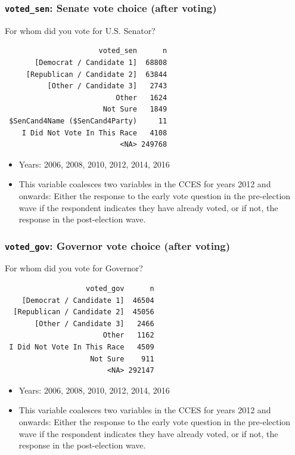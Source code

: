 \documentclass[10pt,article,oneside]{memoir}
\theoremstyle{definition}
\begin{document}
\subsubsection{\texorpdfstring{\texttt{voted\_sen}: Senate vote choice
(after
voting)}{voted\_sen: Senate vote choice (after voting)}}\label{voted_sen-senate-vote-choice-after-voting}

For whom did you vote for U.S. Senator?

\begin{verbatim}
                      voted_sen      n
       [Democrat / Candidate 1]  68808
     [Republican / Candidate 2]  63844
          [Other / Candidate 3]   2743
                          Other   1624
                       Not Sure   1849
 $SenCand4Name ($SenCand4Party)     11
    I Did Not Vote In This Race   4108
                           <NA> 249768
\end{verbatim}

\begin{itemize}
\tightlist
\item
  Years: 2006, 2008, 2010, 2012, 2014, 2016
\item
  This variable coalesces two variables in the CCES for years 2012 and
  onwards: Either the response to the early vote question in the
  pre-election wave if the respondent indicates they have already voted,
  or if not, the response in the post-election wave.
\end{itemize}

\subsubsection{\texorpdfstring{\texttt{voted\_gov}: Governor vote choice
(after
voting)}{voted\_gov: Governor vote choice (after voting)}}\label{voted_gov-governor-vote-choice-after-voting}

For whom did you vote for Governor?

\begin{verbatim}
                   voted_gov      n
    [Democrat / Candidate 1]  46504
  [Republican / Candidate 2]  45056
       [Other / Candidate 3]   2466
                       Other   1162
 I Did Not Vote In This Race   4509
                    Not Sure    911
                        <NA> 292147
\end{verbatim}

\begin{itemize}
\tightlist
\item
  Years: 2006, 2008, 2010, 2012, 2014, 2016
\item
  This variable coalesces two variables in the CCES for years 2012 and
  onwards: Either the response to the early vote question in the
  pre-election wave if the respondent indicates they have already voted,
  or if not, the response in the post-election wave.
\end{itemize}
\end{document}
